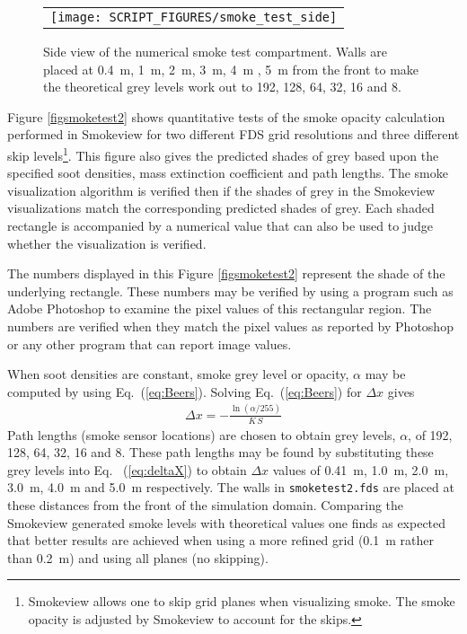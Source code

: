 \documentclass[11pt,twoside]{book}
\begin{document}
\begin{figure}[\figoptions]
\begin{center}
 \centering
\begin{tabular}{c}
 \texttt{[image: SCRIPT\_FIGURES/smoke\_test\_side]}
 \end{tabular}
\end{center}
 \caption[Side view of numerical smoke test compartment.]{Side view of the numerical smoke test compartment.  Walls are placed at \SI{0.4}{m}, \SI{1}{m}, \SI{2}{m}, \SI{3}{m}, \SI{4}{m} , \SI{5}{m} from the front to make the theoretical grey levels work out to 192, 128, 64, 32, 16 and 8.}
\label{figsmoketestgeom}%
\end{figure}

Figure \ref{figsmoketest2} shows quantitative tests of the smoke opacity calculation performed in Smokeview for two different FDS grid resolutions and three different skip levels\footnote{Smokeview allows one to skip grid planes when visualizing smoke.  The smoke opacity is adjusted by Smokeview to account for the skips.}. This figure also gives the predicted shades of grey based upon the specified soot densities, mass extinction coefficient and path lengths.  The smoke visualization algorithm is verified then if the shades of grey in the Smokeview visualizations match the corresponding predicted shades of grey.  Each shaded rectangle is accompanied by a numerical value that can also be used to judge whether the visualization is verified.

The numbers displayed in this Figure \ref{figsmoketest2} represent the shade of the underlying rectangle.  These numbers may be verified by using a program such as Adobe Photoshop to examine the pixel values of this rectangular region.  The numbers are verified when they match the pixel values as reported by Photoshop or any other program that can report image values.

When soot densities are constant, smoke grey level or opacity, $\alpha$ may be computed by using Eq.~(\ref{eq:Beers}).  Solving Eq.~(\ref{eq:Beers}) for $\Delta x$ gives
\begin{eqnarray}
\label{eq:deltaX}
\Delta x = -\frac{\ln(\alpha/255)}{K \, S}
\end{eqnarray}
Path lengths (smoke sensor locations) are chosen to obtain grey levels, $\alpha$, of 192, 128, 64, 32, 16 and 8.  These path lengths may be found by substituting these grey levels into Eq.~ (\ref{eq:deltaX}) to obtain $\Delta x$ values of 0.41~m, 1.0~m, 2.0~m, 3.0~m, 4.0~m and 5.0~m respectively.  The walls in {\tt smoketest2.fds} are placed at these distances from the front of the simulation domain. Comparing the Smokeview generated smoke levels with theoretical values one finds as expected that better results are achieved when using a more refined grid (0.1~m rather than 0.2~m) and using all planes (no skipping).
\end{document}
